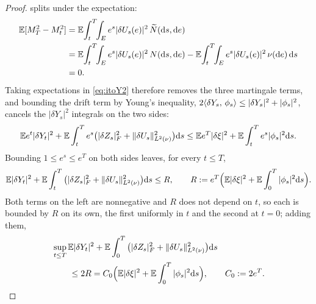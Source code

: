 \begin{proof}
splits under the expectation:
\begin{align*}
\E[M^2_T-M^2_t]
&=\E\!\int_t^T\!\!\int_E e^{s}|\delta U_s(e)|^2\,\Nt(\diff s,\diff e)\\
&=\E\!\int_t^T\!\!\int_E e^{s}|\delta U_s(e)|^2\,N(\diff s,\diff e)
-\E\!\int_t^T\!\!\int_E e^{s}|\delta U_s(e)|^2\,\nu(\diff e)\,\diff s\\
&=0 .
\end{align*}
Taking
expectations in \eqref{eq:itoY2} therefore removes the three martingale terms, and
bounding the drift term by Young's inequality,
$2\langle \delta Y_s,\,\phi_s\rangle\le|\delta Y_s|^2+|\phi_s|^2$, cancels the $|\delta Y_s|^2$
integrals on the two sides:
\[
\mathbb{E} e^{t}|\delta Y_t|^2
+\mathbb{E}\int_t^T e^{s}\big(|\delta Z_s|_F^2+\lVert \delta U_s\rVert_{L^2(\nu)}^2\big)\mathrm{d} s
\le
\mathbb{E} e^{T}|\delta\xi|^2
+\mathbb{E}\int_t^T e^{s}|\phi_s|^2\mathrm{d} s .
\]
Bounding $1\le e^{s}\le e^{T}$ on both sides leaves, for every $t\le T$,
\[
\mathbb{E}|\delta Y_t|^2+\mathbb{E}\int_t^T\big(|\delta Z_s|_F^2+\lVert \delta U_s\rVert_{L^2(\nu)}^2\big)\mathrm{d} s\le R ,
\qquad
R:=e^{T}\Big(\mathbb{E}|\delta\xi|^2+\mathbb{E}\int_0^T|\phi_s|^2\mathrm{d} s\Big).
\]
Both terms on the left are nonnegative and $R$ does not depend on $t$, so each is bounded
by $R$ on its own, the first uniformly in $t$ and the second at $t=0$; adding them,
\begin{equation}\label{eq:supE}
\begin{aligned}
&\sup_{t\le T}\mathbb{E}|\delta Y_t|^2
+\mathbb{E}\int_0^T\big(|\delta Z_s|_F^2+\lVert \delta U_s\rVert_{L^2(\nu)}^2\big)\mathrm{d} s\\
&\qquad\le 2R
=C_0\Big(\mathbb{E}|\delta\xi|^2+\mathbb{E}\int_0^T|\phi_s|^2\mathrm{d} s\Big),
\qquad
C_0:=2e^{T} .
\end{aligned}
\end{equation}


\end{proof}
